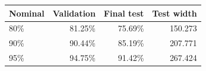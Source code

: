 \begin{tabular}{lrrr}
\toprule
Nominal & Validation & Final test & Test width \\
\midrule
80\% & 81.25\% & 75.69\% & 150.273 \\
90\% & 90.44\% & 85.19\% & 207.771 \\
95\% & 94.75\% & 91.42\% & 267.424 \\
\bottomrule
\end{tabular}
